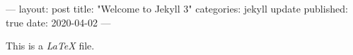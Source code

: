 ---
layout: post
title:  "Welcome to Jekyll 3"
categories: jekyll update
published: true
date: 2020-04-02
---


This is a \emph{LaTeX} file.
